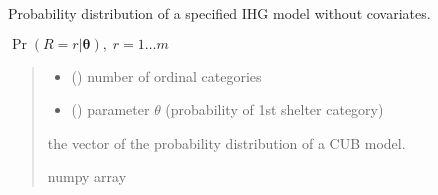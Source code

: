 \documentclass[letterpaper,10pt,english]{sphinxmanual}
\begin{document}

\begin{fulllineitems}
\label{\detokenize{cubmods:cubmods.ihg.pmf}}
\pysigstartsignatures
{}
\pysigstopsignatures
\sphinxAtStartPar
Probability distribution of a specified IHG model without covariates.

\sphinxAtStartPar
\(\Pr(R = r | \pmb\theta),\; r=1 \ldots m\)
\begin{quote}\begin{description}
\begin{itemize}
\item {} 
\sphinxAtStartPar
{} () \textendash{} number of ordinal categories

\item {} 
\sphinxAtStartPar
{} () \textendash{} parameter \(\theta\) (probability of 1st shelter category)

\end{itemize}

\sphinxAtStartPar
the vector of the probability distribution of a CUB model.

\sphinxAtStartPar
numpy array

\end{description}\end{quote}

\end{fulllineitems}

\end{document}
